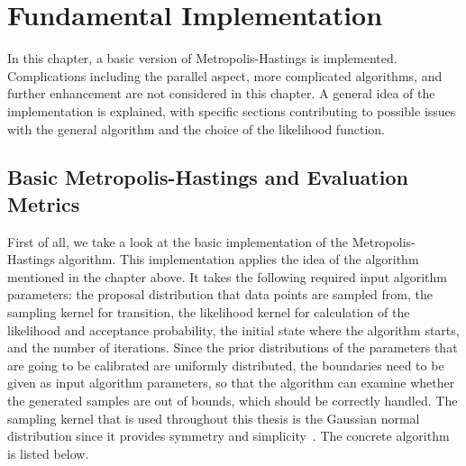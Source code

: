 \chapter{Fundamental Implementation}
In this chapter, a basic version of Metropolis-Hastings is implemented. Complications including the parallel aspect, more complicated algorithms, and further enhancement are not considered in this chapter. A general idea of the implementation is explained, with specific sections contributing to possible issues with the general algorithm and the choice of the likelihood function.
\raggedbottom
\section{Basic Metropolis-Hastings and Evaluation Metrics}
First of all, we take a look at the basic implementation of the Metropolis-Hastings algorithm. This implementation applies the idea of the algorithm mentioned in the chapter above. It takes the following required input algorithm parameters: the proposal distribution that data points are sampled from, the sampling kernel for transition, the likelihood kernel for calculation of the likelihood and acceptance probability, the initial state where the algorithm starts, and the number of iterations. Since the prior distributions of the parameters that are going to be calibrated are uniformly distributed, the boundaries need to be given as input algorithm parameters, so that the algorithm can examine whether the generated samples are out of bounds, which should be correctly handled. The sampling kernel that is used throughout this thesis is the Gaussian normal distribution since it provides symmetry and simplicity~\cite{gaussian_distribution_property}. The concrete algorithm is listed below.
\raggedbottom

